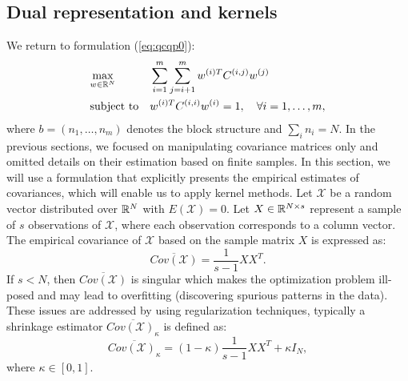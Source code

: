 \subsection{Dual representation and kernels}\label{subsec:kernels}
We return to formulation (\ref{eq:qcqp0}):
 \begin{equation*}
\begin{aligned}
& \underset{w \in \mathbb{R}^N}{\text{max}}
& & \sum_{i = 1}^m \sum_{j = i+1 }^m w^{(i)T} C^{(i,j)} w^{(j)}\\
& \text{subject to}
& &w^{(i)T} C^{(i,i)} w^{(i)} = 1, \quad\forall i = 1,\ldots, m,
\end{aligned}
\end{equation*}
  where $b = \left(n_1,\ldots,n_m\right)$ denotes the block structure
  and $ \sum_i n_i = N $.
 In the previous sections, we focused on manipulating covariance matrices only and omitted details on their estimation based on finite samples. In this section, we will use a formulation that explicitly presents the empirical estimates of covariances, which will enable us to apply kernel methods.
Let $\mathcal{X}$ be a random vector distributed over $\mathbb{R}^N$ with
$E\left(\mathcal{X}\right) = 0$. Let $X \in \mathbb{R}^{N \times s}$
represent a sample of $s$ observations of $\mathcal{X}$, where each
observation corresponds to a column vector. The empirical covariance of $\mathcal{X}$ based on the sample matrix $X$ is expressed as: $$ \overline{Cov\left(\mathcal{X}\right)} = \frac{1}{s - 1}X X^T.$$
If $s < N$, then $\overline{Cov\left(\mathcal{X}\right)}$ is singular which makes the optimization problem ill-posed and may lead to overfitting (discovering spurious patterns in the data). These issues are addressed by using regularization techniques, typically a shrinkage estimator $\overline{Cov\left(\mathcal{X}\right)_{\kappa}}$ is defined as: $$ \overline{Cov\left(\mathcal{X}\right)_{\kappa}} = \left(1-\kappa\right) \frac{1}{s - 1}X X^T + \kappa  I_N,$$ where $\kappa \in \left[0,1\right]$.

